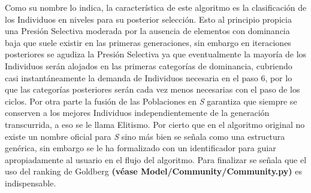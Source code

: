 \documentclass[class=report, crop=false]{standalone}
\begin{document}
Como su nombre lo indica, la característica de este algoritmo es 
la clasificación de los Individuos en niveles para su posterior 
selección.\break
Esto al principio propicia una Presión Selectiva moderada por 
la ausencia de elementos con dominancia baja que suele existir 
en las primeras generaciones, sin embargo en iteraciones posteriores 
se agudiza la Presión Selectiva ya que eventualmente la mayoría de 
los Individuos serán alojados en las primeras categorías de dominancia, 
cubriendo casi instantáneamente la demanda de Individuos necesaria en 
el paso 6, por lo que las categorías posteriores serán cada vez 
menos necesarias con el paso de los ciclos.\medskip\break
Por otra parte la fusión de las Poblaciones en \emph{S} garantiza 
que siempre se conserven a los mejores Individuos independientemente 
de la generación transcurrida, a eso se le llama Elitismo.\break
Por cierto que en el algoritmo original no existe un nombre oficial 
para \emph{S} sino más bien se señala como una estructura genérica, 
sin embargo se le ha formalizado con un identificador para guiar 
apropiadamente al usuario en el flujo del algoritmo.\medskip\break
Para finalizar se señala que el uso del ranking de Goldberg 
\textbf{(véase Model/Community/}\break\textbf{Community.py)} es indispensable.

\end{document}
